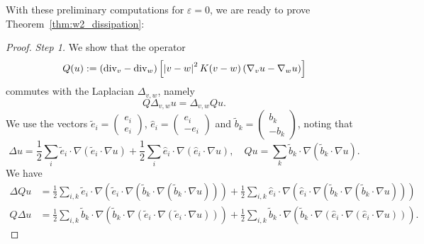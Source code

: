 \documentclass[11pt]{amsart}
\numberwithin{equation}{section}
\begin{document}
With these preliminary computations for $\varepsilon =0$, we are ready to prove Theorem~\ref{thm:w2_dissipation}: 
\begin{proof} \par
  \noindent \textit{Step 1.} We show that the operator 
  \begin{equation*}
    Q(u):=\left(\textnormal{div}_{v}-\textnormal{div}_{w}\right)\left[\left|v-w\right|^{2}K(v-w)\left(\nabla_{v}u-\nabla_{w}u\right)\right]
  \end{equation*}
  commutes with the Laplacian $\Delta_{v,w}$, namely
  \begin{equation*}
    Q\Delta_{v,w}u=\Delta_{v,w}Qu.
  \end{equation*}
%
We use the vectors $\tilde{e}_{i}=\begin{pmatrix}e_{i}\\e_{i}\end{pmatrix}$, $\hat{e}_{i}=\begin{pmatrix}e_{i}\\-e_{i}\end{pmatrix}$ and 
  $\tilde{b}_{k}=\begin{pmatrix}b_{k}\\-b_{k}\end{pmatrix}$, noting that
  \begin{equation*}
    \Delta u=\frac{1}{2}\sum_{i}\tilde{e}_{i}\cdot\nabla\left(\tilde{e}_{i}\cdot\nabla u\right)+\frac{1}{2}\sum_{i}\hat{e}_{i}\cdot\nabla\left(\hat{e}_{i}\cdot\nabla u\right)
    ,\quad Qu=\sum_{k}\tilde{b}_{k}\cdot\nabla\left(\tilde{b}_{k}\cdot\nabla u\right).
  \end{equation*}
  We have 
  \begin{align}
    \Delta Qu & =\frac{1}{2}\sum_{i,k}\tilde{e}_{i}\cdot\nabla\left(\tilde{e}_{i}\cdot\nabla\left(\tilde{b}_{k}\cdot\nabla\left(\tilde{b}_{k}\cdot\nabla u\right)\right)\right)
    +\frac{1}{2}\sum_{i,k}\hat{e}_{i}\cdot\nabla\left(\hat{e}_{i}\cdot\nabla\left(\tilde{b}_{k}\cdot\nabla\left(\tilde{b}_{k}\cdot\nabla u\right)\right)\right)\label{eq:Laplacian_Q}\\
    Q\Delta u & =\frac{1}{2}\sum_{i,k}\tilde{b}_{k}\cdot\nabla\left(\tilde{b}_{k}\cdot\nabla\left(\tilde{e}_{i}\cdot\nabla\left(\tilde{e}_{i}\cdot\nabla u\right)\right)\right)
    +\frac{1}{2}\sum_{i,k}\tilde{b}_{k}\cdot\nabla\left(\tilde{b}_{k}\cdot\nabla\left(\hat{e}_{i}\cdot\nabla\left(\hat{e}_{i}\cdot\nabla u\right)\right)\right).\label{eq:Q_Laplacian}
  \end{align}

\end{proof}
\end{document}
